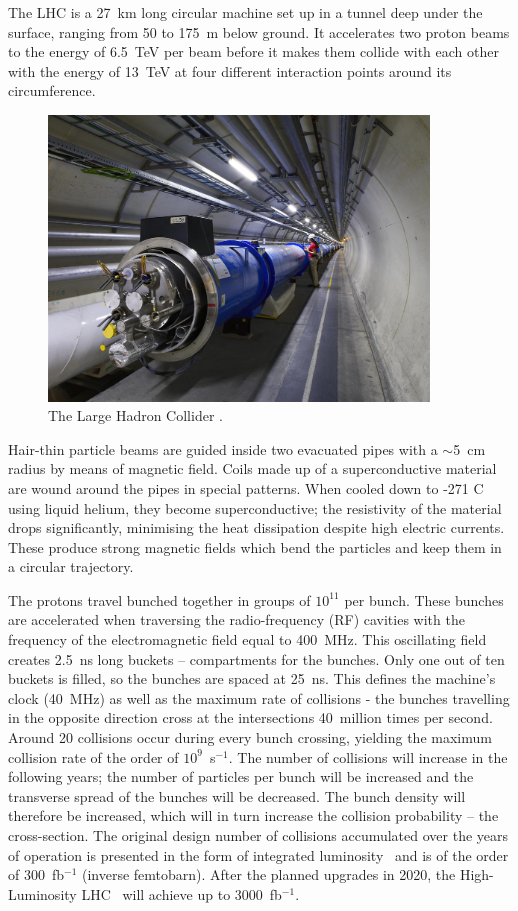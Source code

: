 The LHC is a 27~km long circular machine set up in a tunnel deep under the surface, ranging from 50 to 175~m below ground. It accelerates two proton beams to the energy of 6.5~TeV per beam before it makes them collide with each other with the energy of 13~TeV at four different interaction points around its circumference. 
\begin{figure}[!t]
\centering
\includegraphics[width=0.9\textwidth]{01_introduction/pics/lhc}
\caption{The Large Hadron Collider \cite{Maximilien:1324852}.}
\label{fig:lhc}
\end{figure}
Hair-thin particle beams are guided inside two evacuated pipes with a $\sim$5~cm radius by means of magnetic field. Coils made up of a superconductive material are wound around the pipes in special patterns. When cooled down to -271 \textdegree C using liquid helium, they become superconductive; the resistivity of the material drops significantly, minimising the heat dissipation despite high electric currents. These produce strong magnetic fields which bend the particles and keep them in a circular trajectory. 

The protons travel bunched together in groups of $10^{11}$ per bunch. These bunches are accelerated when traversing the radio-frequency (RF) cavities with the frequency of the electromagnetic field equal to 400~MHz. This oscillating field creates 2.5~ns long buckets -- compartments for the bunches. Only one out of ten buckets is filled, so the bunches are spaced at 25~ns. This defines the machine's clock (40~MHz) as well as the maximum rate of collisions - the bunches travelling in the opposite direction cross at the intersections 40~million times per second. Around 20 collisions occur during every bunch crossing, yielding the maximum collision rate of the order of $10^9$~s$^{-1}$. The number of collisions will increase in the following years; the number of particles per bunch will be increased and the transverse spread of the bunches will be decreased. The bunch density will therefore be increased, which will in turn increase the collision probability -- the cross-section. The original design number of collisions accumulated over the years of operation is presented in the form of integrated luminosity~\cite{} and is of the order of 300~fb$^{-1}$ (inverse femtobarn). After the planned upgrades in 2020, the High-Luminosity LHC~\cite{} will achieve up to 3000~fb$^{-1}$.

